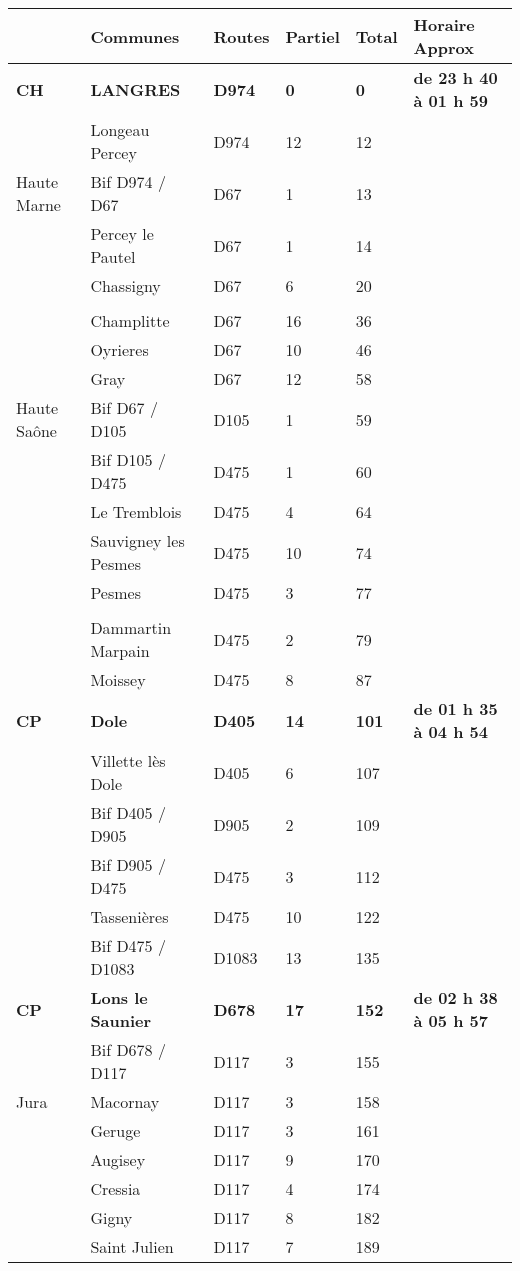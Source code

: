 \documentclass{article}%
\begin{document}
\begin{longtable}{p{2.25cm}|p{7.0cm}|p{1.5cm}|p{1.5cm}|p{1.5cm}|p{3.5cm}}%
\hline%
&Communes&Routes&Partiel&Total&Horaire Approx\\%
\hline%
\endhead%
\endfoot%
\endlastfoot%
\textbf{﻿CH}&\textbf{LANGRES }&\textbf{D974}&\textbf{0}&\textbf{0}&\textbf{de 23 h 40 à 01 h 59}\\%
 &Longeau  Percey&D974&12&12& \\%
Haute Marne&Bif D974 / D67&D67&1&13& \\%
 &Percey le Pautel&D67&1&14& \\%
 &Chassigny&D67&6&20& \\%
\hline& & & & & \\%
 &Champlitte&D67&16&36& \\%
 &Oyrieres&D67&10&46& \\%
 &Gray &D67&12&58& \\%
Haute Saône&Bif D67 / D105&D105&1&59& \\%
 &Bif D105 / D475&D475&1&60& \\%
 &Le Tremblois&D475&4&64& \\%
 &Sauvigney les Pesmes&D475&10&74& \\%
 &Pesmes&D475&3&77& \\%
\hline& & & & & \\%
 &Dammartin Marpain&D475&2&79& \\%
 &Moissey &D475&8&87& \\%
\textbf{CP}&\textbf{Dole }&\textbf{D405}&\textbf{14}&\textbf{101}&\textbf{de 01 h 35 à 04 h 54}\\%
 &Villette lès Dole&D405&6&107& \\%
 &Bif D405 / D905 &D905 &2&109& \\%
 &Bif D905 / D475 &D475&3&112& \\%
 &Tassenières&D475&10&122& \\%
 &Bif D475 / D1083&D1083&13&135& \\%
\textbf{CP}&\textbf{Lons le Saunier}&\textbf{D678}&\textbf{17}&\textbf{152}&\textbf{de 02 h 38 à 05 h 57}\\%
 &Bif D678 / D117&D117&3&155& \\%
Jura&Macornay&D117&3&158& \\%
 &Geruge&D117&3&161& \\%
 &Augisey&D117&9&170& \\%
 &Cressia&D117&4&174& \\%
 &Gigny&D117&8&182& \\%
 &Saint Julien&D117&7&189& \\%

\end{longtable}
\end{document}
